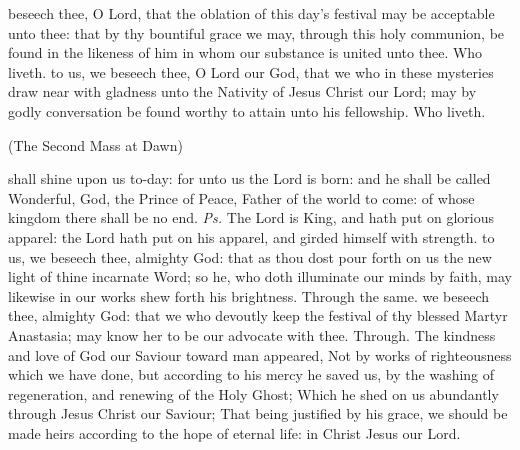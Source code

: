 \secret
{} beseech thee, O Lord, that the oblation of this day's festival may be acceptable unto thee: that by thy bountiful grace we may, through this holy communion, be found in the likeness of him in whom our substance is united unto thee. Who liveth.
\postcommunion
{} to us, we beseech thee, O Lord our God, that we who in these mysteries draw near with gladness unto the Nativity of Jesus Christ our Lord; may by godly conversation be found worthy to attain unto his fellowship. Who liveth.

\centerline{\small{(The Second Mass at Dawn)}}
\introit
{} shall shine upon us to-day: for unto us the Lord is born: and he shall be called Wonderful, God, the Prince of Peace, Father of the world to come: of whose kingdom there shall be no end. \textit{Ps.} The Lord is King, and hath put on glorious apparel: the Lord hath put on his apparel, and girded himself with strength.
\collect
{} to us, we beseech thee, almighty God: that as thou dost pour forth on us the new light of thine incarnate Word; so he, who doth illuminate our minds by faith, may likewise in our works shew forth his brightness. Through the same.
 we beseech thee, almighty God: that we who devoutly keep the festival of thy blessed Martyr Anastasia; may know her to be our advocate with thee. Through.
 The kindness and love of God our Saviour toward man appeared, Not by works of righteousness which we have done, but according to his mercy he saved us, by the washing of regeneration, and renewing of the Holy Ghost; Which he shed on us abundantly through Jesus Christ our Saviour; That being justified by his grace, we should be made heirs according to the hope of eternal life: %
in Christ Jesus our Lord.
